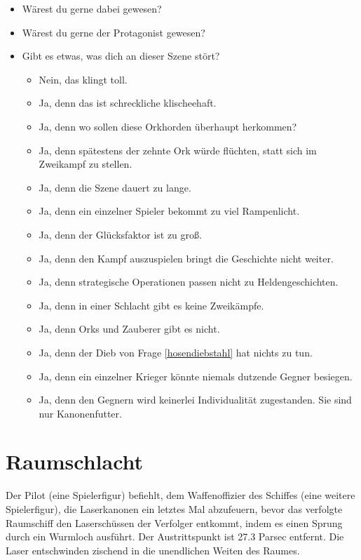 \documentclass{article}
\begin{document}
\begin{itemize}
\item  Wärest du gerne dabei gewesen?
\item  Wärest du gerne der Protagonist gewesen?
\item  Gibt es etwas, was dich an dieser Szene stört?
  \begin{itemize}
  \item Nein, das klingt toll.
  \item Ja, denn das ist schreckliche klischeehaft.
  \item Ja, denn wo sollen diese Orkhorden überhaupt herkommen?
  \item Ja, denn spätestens der zehnte Ork würde flüchten, statt sich im Zweikampf zu stellen.
  \item Ja, denn die Szene dauert zu lange.
  \item Ja, denn ein einzelner Spieler bekommt zu viel Rampenlicht.
  \item Ja, denn der Glücksfaktor ist zu groß.
  \item Ja, denn den Kampf auszuspielen bringt die Geschichte nicht weiter.
  \item Ja, denn strategische Operationen passen nicht zu Heldengeschichten.
  \item Ja, denn in einer Schlacht gibt es keine Zweikämpfe.
  \item Ja, denn Orks und Zauberer gibt es nicht.
  \item Ja, denn der Dieb von Frage \ref{hosendiebstahl} hat nichts zu tun.
  \item Ja, denn ein einzelner Krieger könnte niemals dutzende Gegner besiegen.
  \item Ja, denn den Gegnern wird keinerlei Individualität zugestanden. Sie sind nur Kanonenfutter.
  \end{itemize}
\end{itemize}

\section{Raumschlacht}
\label{raumschlacht}

Der Pilot (eine Spielerfigur) befiehlt, dem Waffenoffizier des
Schiffes (eine weitere Spielerfigur), die Laserkanonen ein letztes Mal
abzufeuern, bevor das verfolgte Raumschiff den Laserschüssen der
Verfolger entkommt, indem es einen Sprung durch ein Wurmloch
ausführt. Der Austrittspunkt ist 27.3 Parsec entfernt. Die Laser
entschwinden zischend in die unendlichen Weiten des Raumes.
\end{document}
